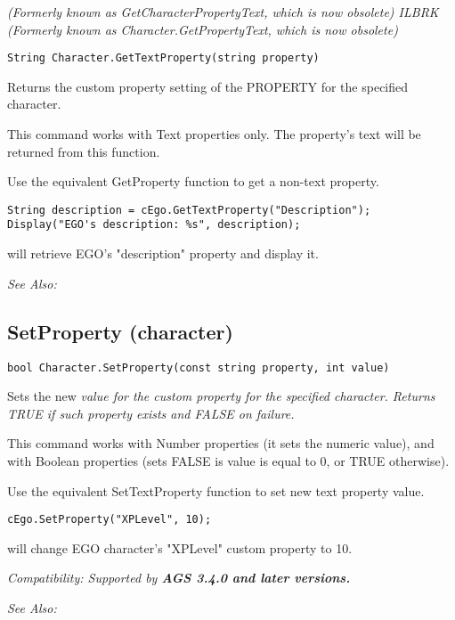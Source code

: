 \it{(Formerly known as GetCharacterPropertyText, which is now obsolete)} ILBRK
\it{(Formerly known as Character.GetPropertyText, which is now obsolete)}

\begin{verbatim}
String Character.GetTextProperty(string property)
\end{verbatim}
Returns the custom property setting of the PROPERTY for the specified character.

This command works with Text properties only. The property's text will be
returned from this function.

Use the equivalent GetProperty function to get a non-text property.

\begin{verbatim}
String description = cEgo.GetTextProperty("Description");
Display("EGO's description: %s", description);
\end{verbatim}
will retrieve EGO's "description" property and display it.

\it{See Also:} 


\subsection{SetProperty (character)}\label{Character.SetProperty}%

\begin{verbatim}
bool Character.SetProperty(const string property, int value)
\end{verbatim}
Sets the new \it{value} for the custom \it{property} for the specified character. Returns
TRUE if such property exists and FALSE on failure.

This command works with Number properties (it sets the numeric value), and with Boolean
properties (sets FALSE is value is equal to 0, or TRUE otherwise).

Use the equivalent SetTextProperty function to set new text property value.

\begin{verbatim}
cEgo.SetProperty("XPLevel", 10);
\end{verbatim}
will change EGO character's "XPLevel" custom property to 10.

\it{Compatibility:} Supported by \bf{AGS 3.4.0} and later versions.

\it{See Also:} 


